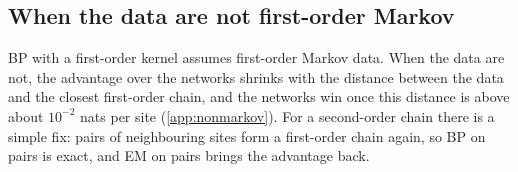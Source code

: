 \subsection{When the data are not first-order Markov}
\label{sec:nonmarkov}

BP with a first-order kernel assumes first-order Markov data. When the data are not, the advantage over the networks
shrinks with the distance between the data and the closest first-order chain, and the networks win once this distance
is above about $10^{-2}$ nats per site (\cref{app:nonmarkov}). For a second-order chain there is a simple fix: pairs of
neighbouring sites form a first-order chain again, so BP on pairs is exact, and EM on pairs brings the advantage back.
